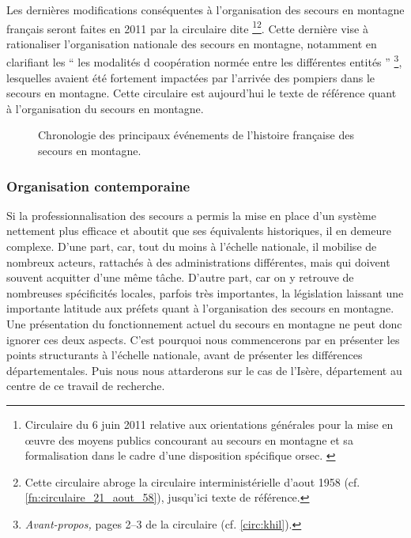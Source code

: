 Les dernières modifications conséquentes à l’organisation des secours
en montagne français seront faites en 2011 par la circulaire dite
 \footnote{Circulaire du 6 juin 2011 relative aux
  orientations générales pour la mise en œuvre des moyens publics
  concourant au secours en montagne et sa formalisation dans le cadre
  d’une disposition spécifique
  \ac{orsec}. \label{circ:khil}}\multiplefootnoteseparator\footnote{Cette
  circulaire abroge la circulaire interministérielle d'aout 1958
  (cf. \autoref{fn:circulaire_21_aout_58}), jusqu'ici texte de
  référence.}. Cette dernière vise à rationaliser l'organisation
nationale des secours en montagne, notamment en clarifiant les
\enquote{\textelp{} les modalités d coopération normée
  entre les différentes entités \textelp{}}
\footnote{\emph{Avant-propos,} pages 2--3 de la circulaire 
  (cf. \autoref{circ:khil}).}, lesquelles avaient été fortement
impactées par l'arrivée des pompiers dans le secours en montagne. Cette
circulaire est aujourd'hui le texte de référence quant à
l'organisation du secours en montagne.

\begin{figure}
  \centering
   
   \caption{Chronologie des principaux événements de
     l'histoire française des secours en montagne.}
  \label{fig:frise_chronologique}
\end{figure}

\subsubsection{Organisation contemporaine}
\label{subsubsec:1-1-1-2}

Si la professionnalisation des secours a permis la mise en place d'un
système nettement plus efficace et aboutit que ses équivalents
historiques, il en demeure complexe. D'une part, car, tout du moins à
l'échelle nationale, il mobilise de nombreux acteurs, rattachés à des
administrations différentes, mais qui doivent souvent acquitter d'une
même tâche. D'autre part, car on y retrouve de nombreuses spécificités
locales, parfois très importantes, la législation laissant une
importante latitude aux préfets quant à l'organisation des secours en
montagne. Une présentation du fonctionnement actuel du secours en
montagne ne peut donc ignorer ces deux aspects. C'est pourquoi nous
commencerons par en présenter les points structurants à l'échelle
nationale, avant de présenter les différences départementales. Puis
nous nous attarderons sur le cas de l'Isère, département au centre de
ce travail de recherche.

